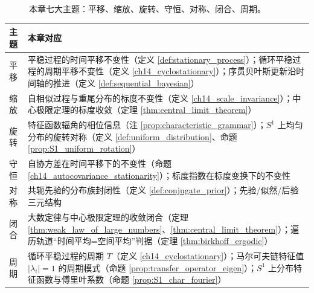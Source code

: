 \begin{figure}[htbp]
\centering
{}
\caption{本章七大主题：平移、缩放、旋转、守恒、对称、闭合、周期。}
\label{fig:probability_themes}
\end{figure}

\begin{center}
\renewcommand{\arraystretch}{1.3}
\begin{tabular}{>{\centering\arraybackslash}p{2.2cm}>{\centering\arraybackslash}p{10.5cm}}
\toprule
主题 & 本章对应 \\
\midrule
平移 & 平稳过程的时间平移不变性（定义 \ref{def:stationary_process}）；循环平稳过程的周期平移不变性（定义 \ref{ch14_cyclostationary}）；序贯贝叶斯更新沿时间轴的推进（定义 \ref{def:sequential_bayesian}） \\
缩放 & 自相似过程与重尾分布的标度不变性（定义 \ref{ch14_scale_invariance}）；中心极限定理的标度收敛（定理 \ref{thm:central_limit_theorem}） \\
旋转 & 特征函数辐角的相位信息（注 \ref{prop:characteristic_grammar}）；$S^1$ 上均匀分布的旋转对称（定义 \ref{def:uniform_distribution}、命题 \ref{prop:S1_uniform_rotation}） \\
守恒 & 自协方差在时间平移下的不变性（命题 \ref{ch14_autocovariance_stationarity}）；标度指数在标度变换下的不变性 \\
对称 & 共轭先验的分布族封闭性（定义 \ref{def:conjugate_prior}）；先验/似然/后验三元结构 \\
闭合 & 大数定律与中心极限定理的收敛闭合（定理 \ref{thm:weak_law_of_large_numbers}、\ref{thm:central_limit_theorem}）；遍历轨道“时间平均=空间平均”判据（定理 \ref{thm:birkhoff_ergodic}） \\
周期 & 循环平稳过程的周期 $T$（定义 \ref{ch14_cyclostationary}）；马尔可夫链特征值 $|\lambda_i|=1$ 的周期模式（命题 \ref{prop:transfer_operator_eigen}）；$S^1$ 上分布特征函数与傅里叶系数（命题 \ref{prop:S1_char_fourier}） \\
\bottomrule
\end{tabular}
\end{center}


